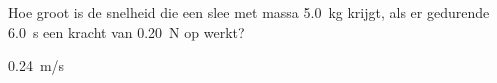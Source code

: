 
\begin{exercise}



Hoe groot is de snelheid die een slee met massa \SI{5,0}{kg} krijgt, als er gedurende \SI{6,0}{s} een kracht van \SI{0,20}{N} op werkt?

\begin{oplossing}
\SI{0,24}{m/s}
\end{oplossing}


\end{exercise}
